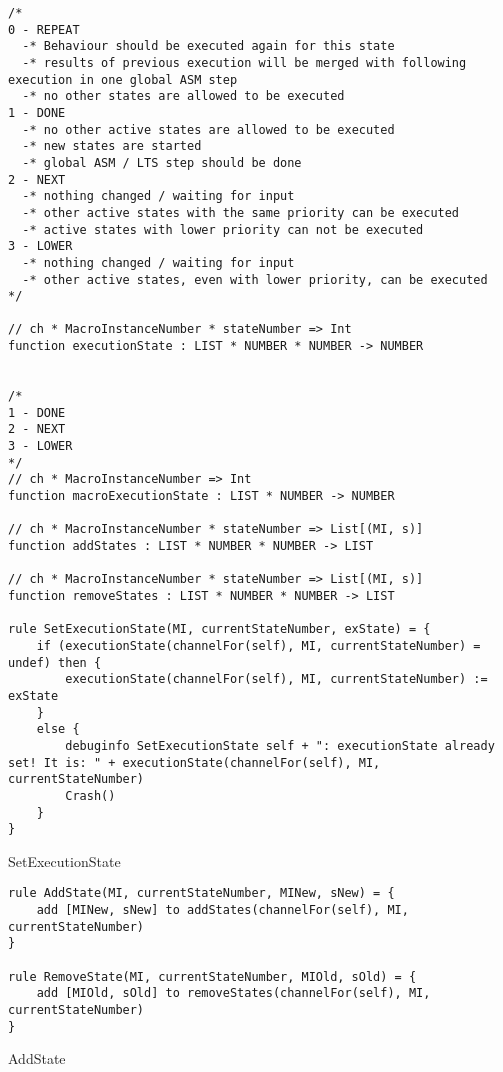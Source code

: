 \begin{listing}[H]
\begin{verbatim}
/*
0 - REPEAT
  -* Behaviour should be executed again for this state
  -* results of previous execution will be merged with following execution in one global ASM step
  -* no other states are allowed to be executed
1 - DONE
  -* no other active states are allowed to be executed
  -* new states are started
  -* global ASM / LTS step should be done
2 - NEXT
  -* nothing changed / waiting for input
  -* other active states with the same priority can be executed
  -* active states with lower priority can not be executed
3 - LOWER
  -* nothing changed / waiting for input
  -* other active states, even with lower priority, can be executed
*/

// ch * MacroInstanceNumber * stateNumber => Int
function executionState : LIST * NUMBER * NUMBER -> NUMBER


/*
1 - DONE
2 - NEXT
3 - LOWER
*/
// ch * MacroInstanceNumber => Int
function macroExecutionState : LIST * NUMBER -> NUMBER

// ch * MacroInstanceNumber * stateNumber => List[(MI, s)]
function addStates : LIST * NUMBER * NUMBER -> LIST

// ch * MacroInstanceNumber * stateNumber => List[(MI, s)]
function removeStates : LIST * NUMBER * NUMBER -> LIST

rule SetExecutionState(MI, currentStateNumber, exState) = {
    if (executionState(channelFor(self), MI, currentStateNumber) = undef) then {
        executionState(channelFor(self), MI, currentStateNumber) := exState
    }
    else {
        debuginfo SetExecutionState self + ": executionState already set! It is: " + executionState(channelFor(self), MI, currentStateNumber)
        Crash()
    }
}
\end{verbatim}
\caption{SetExecutionState}
\label{lst:asm:SetExecutionState}
\end{listing}




\begin{listing}[H]
\begin{verbatim}
rule AddState(MI, currentStateNumber, MINew, sNew) = {
    add [MINew, sNew] to addStates(channelFor(self), MI, currentStateNumber)
}

rule RemoveState(MI, currentStateNumber, MIOld, sOld) = {
    add [MIOld, sOld] to removeStates(channelFor(self), MI, currentStateNumber)
}
\end{verbatim}
\caption{AddState}
\label{lst:asm:AddState}
\end{listing}




